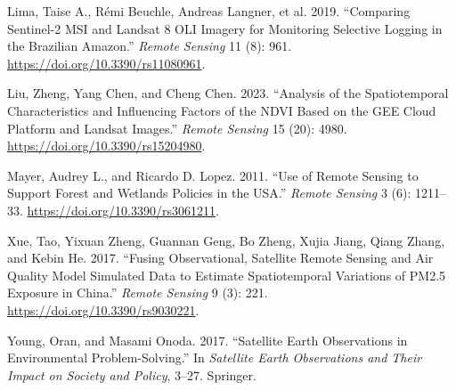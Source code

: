 \documentclass[
  letterpaper,
]{scrbook}
\newlength{\cslhangindent}
\newenvironment{CSLReferences}[2] %
 {\begin{list}{}{%
  \setlength{\itemindent}{0pt}
  \setlength{\leftmargin}{0pt}
  \setlength{\parsep}{0pt}
  \ifodd #1
   \setlength{\leftmargin}{\cslhangindent}
   \setlength{\itemindent}{-1\cslhangindent}
  \fi
  \setlength{\itemsep}{#2\baselineskip}}}
 {\end{list}}
\begin{document}
\begin{CSLReferences}{1}{0}
Lima, Taise A., Rémi Beuchle, Andreas Langner, et al. 2019. {``Comparing
Sentinel-2 MSI and Landsat 8 OLI Imagery for Monitoring Selective
Logging in the Brazilian Amazon.''} \emph{Remote Sensing} 11 (8): 961.
\url{https://doi.org/10.3390/rs11080961}.

Liu, Zheng, Yang Chen, and Cheng Chen. 2023. {``Analysis of the
Spatiotemporal Characteristics and Influencing Factors of the {NDVI}
Based on the {GEE} Cloud Platform and {Landsat} Images.''} \emph{Remote
Sensing} 15 (20): 4980. \url{https://doi.org/10.3390/rs15204980}.

Mayer, Audrey L., and Ricardo D. Lopez. 2011. {``Use of Remote Sensing
to Support Forest and Wetlands Policies in the {USA}.''} \emph{Remote
Sensing} 3 (6): 1211--33. \url{https://doi.org/10.3390/rs3061211}.

Xue, Tao, Yixuan Zheng, Guannan Geng, Bo Zheng, Xujia Jiang, Qiang
Zhang, and Kebin He. 2017. {``Fusing Observational, Satellite Remote
Sensing and Air Quality Model Simulated Data to Estimate Spatiotemporal
Variations of {PM2}.5 Exposure in {China}.''} \emph{Remote Sensing} 9
(3): 221. \url{https://doi.org/10.3390/rs9030221}.

Young, Oran, and Masami Onoda. 2017. {``Satellite Earth Observations in
Environmental Problem-Solving.''} In \emph{Satellite Earth Observations
and Their Impact on Society and Policy}, 3--27. Springer.

\end{CSLReferences}


\backmatter
\end{document}
